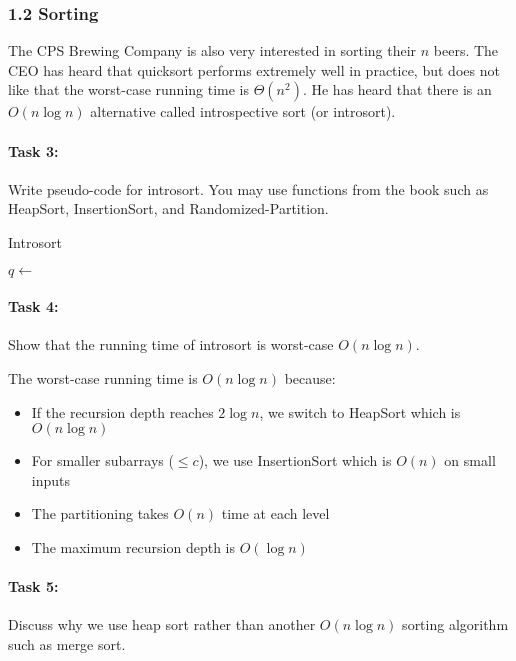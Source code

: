 \documentclass{article}
\theoremstyle{definition}
\begin{document}
\subsubsection{1.2 Sorting}
The CPS Brewing Company is also very interested in sorting their $n$ beers. The CEO has heard that quicksort performs extremely well in practice, but does not like that the worst-case running time is $\Theta(n^2)$. He has heard that there is an $O(n \log n)$ alternative called introspective sort (or introsort).

\paragraph{Task 3:} Write pseudo-code for introsort. You may use functions from the book such as HeapSort, InsertionSort, and Randomized-Partition.

\begin{algorithm}
\caption{Introsort}
\begin{algorithmic}[1]
      
        \State {}
        \State {}
    \Else
        \State $q \gets$ 
        \State {}
        \State {}
    \EndIf
\EndFunction
\end{algorithmic}
\end{algorithm}

\paragraph{Task 4:} Show that the running time of introsort is worst-case $O(n \log n)$.

The worst-case running time is $O(n \log n)$ because:
\begin{itemize}
    \item If the recursion depth reaches $2\log n$, we switch to HeapSort which is $O(n \log n)$
    \item For smaller subarrays ($\leq c$), we use InsertionSort which is $O(n)$ on small inputs
    \item The partitioning takes $O(n)$ time at each level
    \item The maximum recursion depth is $O(\log n)$
\end{itemize}

\paragraph{Task 5:} Discuss why we use heap sort rather than another $O(n \log n)$ sorting algorithm such as merge sort.
\end{document}
